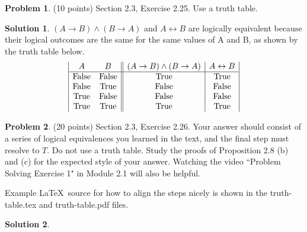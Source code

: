\documentclass{article}
\theoremstyle{definition}
\newtheorem{problem}{Problem}
\newtheorem*{solution}{Solution}
\begin{document}
\newpage
\begin{problem} (10 points) Section 2.3, Exercise 2.25.
Use a truth table.
\end{problem}
\begin{solution} 
$(A \rightarrow B) \land (B \rightarrow A)$ and $A \leftrightarrow B$ are logically equivalent because their logical outcomes are the same for the same values of A and B, as shown by the truth table below.
\begin{displaymath}
\begin{array}{|c c||c|c|}
A & B & (A \rightarrow B) \land (B \rightarrow A) & A \leftrightarrow B \\
\hline
\text{False} & \text{False} & \text{True} & \text{True} \\
\text{False} & \text{True} & \text{False} & \text{False} \\
\text{True} & \text{False} & \text{False} & \text{False} \\
\text{True} & \text{True} & \text{True} & \text{True} \\
\end{array}
\end{displaymath}
    
\end{solution}

\newpage
\begin{problem} (20 points) Section 2.3, Exercise 2.26.
Your answer should consist of a series of logical equivalences 
you learned in the text, and the final step must resolve to $T$.
Do not use a truth table.  Study the proofs of Proposition 2.8 (b) and (c) 
for the expected style of your answer.  Watching the video ``Problem 
Solving Exercise 1" in Module {2.1} will also be helpful.

Example \LaTeX\ source for how to align the steps nicely is shown 
in the truth-table.tex and truth-table.pdf files.
\end{problem}
\begin{solution} 
\end{solution}
\end{document}
